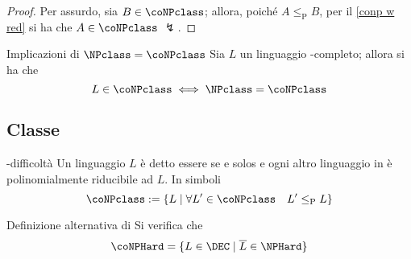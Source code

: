 \documentclass[a4paper, 12pt]{report}
\begin{document}
    \begin{proof}
        Per assurdo, sia $B \in \coNPclass$; allora, poiché $A \leq_\mathrm P B$, per il \cref{conp w red} si ha che $A \in \coNPclass$ $\lightning$.
    \end{proof}

    \begin{framedcor}[label={np = conp impl 1}]{Implicazioni di $\NPclass = \coNPclass$}
        Sia $L$ un linguaggio \NPclass-completo; allora si ha che $$L \in \coNPclass \iff \NPclass = \coNPclass$$
    \end{framedcor}


    \subsection{Classe \coNPComplete}

    \begin{frameddefn}{\coNPclass-difficoltà}
        Un linguaggio $L$ è detto essere  se e solos e ogni altro linguaggio in \coNPclass è polinomialmente riducibile ad $L$. In simboli $$\coNPclass := \{L \mid \forall L' \in \coNPclass \quad L' \leq_\mathrm P L\}$$
    \end{frameddefn}

    \begin{framedthm}[label={np-hard conp-hard}]{Definizione alternativa di \coNPHard}
        Si verifica che $$\coNPHard = \{L \in \DEC \mid \overline L \in \NPHard\}$$
    \end{framedthm}
\end{document}
